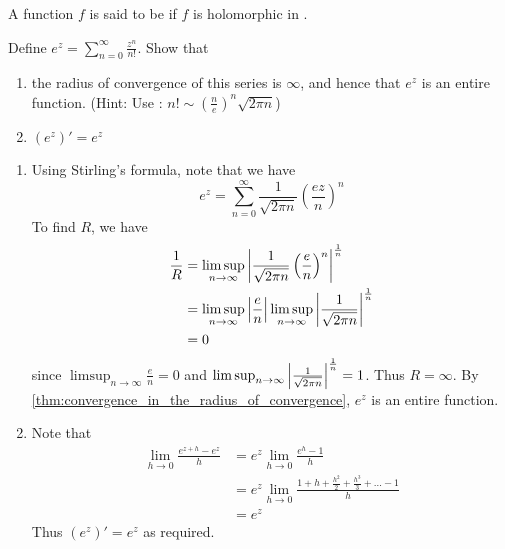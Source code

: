 \documentclass[11pt, oneside]{book}
\begin{document}
\begin{defn}
	A function $f$ is said to be  if $f$ is holomorphic in .
\end{defn}

\begin{ex}
	Define $e^z = \sum_{n=0}^{\infty} \frac{z^n}{n!}$. Show that
	\begin{enumerate}
		\item the radius of convergence of this series is $\infty$, and hence that $e^z$ is an entire function. (Hint: Use : $n! \sim (\frac{n}{e})^n \sqrt{2 \pi n}$)
		\item $(e^z)' = e^z$
	\end{enumerate}

	\begin{solution}
		\begin{enumerate}
			\item Using Stirling's formula, note that we have
			\begin{equation*}
				e^z = \sum_{n=0}^{\infty} \frac{1}{\sqrt{2 \pi n}} \left(\frac{ez}{n} \right)^n
			\end{equation*}
			To find $R$, we have
			\begin{align*}
				\frac{1}{R} &= \limsup_{n \to \infty} \left|\frac{1}{\sqrt{2 \pi n}} \left(\frac{e}{n} \right)^n \right|^\frac{1}{n} \\
					&= \limsup_{n \to \infty} \left|\frac{e}{n}\right| \limsup_{n \to \infty} \left|\frac{1}{\sqrt{2 \pi n}}\right|^\frac{1}{n} \\
					&= 0
			\end{align*}
			since $\limsup_{n \to \infty} \frac{e}{n} = 0$ and $\limsup_{n \to \infty} \left|\frac{1}{\sqrt{2 \pi n}}\right|^\frac{1}{n} = 1$. Thus $R = \infty$. By \cref{thm:convergence_in_the_radius_of_convergence}, $e^z$ is an entire function.

			\item Note that
			\begin{align*}
				\lim_{h \to 0} \frac{e^{z + h} - e^z}{h} &= e^z \lim_{h \to 0} \frac{e^h - 1}{h}  \\
					&= e^z \lim_{h \to 0} \frac{1 + h + \frac{h^2}{2} + \frac{h^3}{3} + \hdots - 1}{h} \\
					&= e^z
			\end{align*}
			Thus $(e^z)' = e^z$ as required.
		\end{enumerate}
	\end{solution}
\end{ex}
\end{document}
